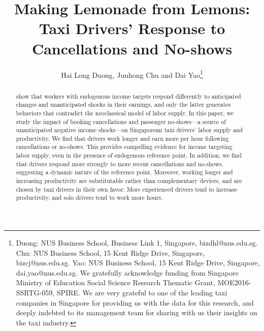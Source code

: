 \documentclass[reviewmode]{restud}
\begin{document}

\title{Making Lemonade from Lemons: Taxi Drivers' Response to Cancellations and No-shows}
\author{Hai Long Duong, Junhong Chu and Dai Yao\thanks{Duong: NUS Business School, Business Link 1, Singapore, bizdhl@nus.edu.sg. Chu: NUS Business School, 15 Kent Ridge Drive, Singapore, bizcj@nus.edu.sg. Yao: NUS Business School, 15 Kent Ridge Drive, Singapore, dai.yao@nus.edu.sg. We gratefully acknowledge funding from Singapore Ministry of Education Social Science Research Thematic Grant, MOE2016-SSRTG-059, SPIRE. We are very grateful to one of the leading taxi companies in Singapore for providing us with the data for this research, and deeply indebted to its management team for sharing with us their insights on the taxi industry.}}


\begin{abstract}
	\citet{kHoszegi2006model} show that workers with endogenous income targets respond differently to anticipated changes and unanticipated shocks in their earnings, and only the latter generates behaviors that contradict the neoclassical model of labor supply. In this paper, we study the impact of booking cancellations and passenger no-shows---a source of unanticipated negative income shocks---on Singaporean taxi drivers' labor supply and productivity. We find that drivers work longer and earn more per hour following cancellations or no-shows. This provides compelling evidence for income targeting labor supply, even in the presence of endogenous reference point. In addition, we find that drivers respond more strongly to more recent cancellations and no-shows, suggesting a dynamic nature of the reference point. Moreover, working longer and increasing productivity are substitutable rather than complementary devices, and are chosen by taxi drivers in their own favor: More experienced drivers tend to increase productivity, and solo drivers tend to work more hours. 
\end{abstract}
\end{document}
